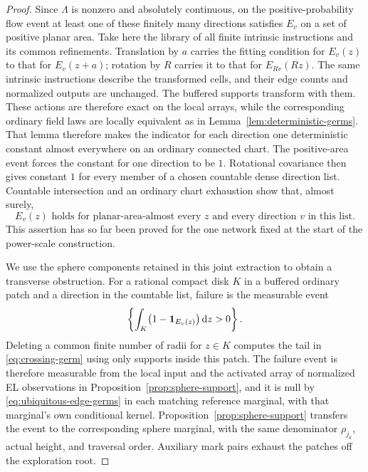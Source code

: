 \begin{proof}
Since \(\Lambda\) is nonzero and absolutely continuous, on the
positive-probability flow event at least one of these finitely many
directions satisfies \(E_v\) on a set of positive planar area.
Take here the library of all finite intrinsic instructions and its common
refinements.  Translation by \(a\) carries the fitting condition for
\(E_v(z)\) to that for \(E_v(z+a)\); rotation by \(R\) carries it to that
for \(E_{Rv}(Rz)\).  The same intrinsic instructions describe the
transformed cells, and their edge counts and normalized outputs are
unchanged.  The buffered supports transform with them.  These actions are
therefore exact on the local arrays, while the corresponding ordinary
field laws are locally equivalent as in
Lemma~\ref{lem:deterministic-germs}.  That lemma
therefore makes the indicator for each direction one deterministic
constant almost everywhere on an ordinary connected chart.  The
positive-area event forces the constant for one direction to be \(1\).
Rotational covariance then gives constant \(1\) for every member of a
chosen countable dense direction list.  Countable intersection and an
ordinary chart exhaustion show that, almost surely,
\begin{equation}\label{eq:ubiquitous-edge-germs}
 E_v(z)\text{ holds for planar-area-almost every }z
 \text{ and every direction }v\text{ in this list}.
\end{equation}
This assertion has so far been proved for the one network fixed at the
start of the power-scale construction.

We use the sphere components retained in this joint extraction to obtain
a transverse obstruction.  For a rational compact disk \(K\) in a buffered ordinary
patch and a direction in the countable list, failure is the measurable event
\[
 \left\{\int_K\bigl(1-\mathbf 1_{E_v(z)}\bigr)\,\mathrm d z>0\right\}.
\]
Deleting a common finite number of radii for \(z\in K\) computes the tail
in \eqref{eq:crossing-germ} using only supports inside this patch.  The
failure event is therefore measurable from the local input and the
activated array of normalized EL observations in
Proposition~\ref{prop:sphere-support}, and it is null by
\eqref{eq:ubiquitous-edge-germs} in each matching reference marginal,
with that marginal's own conditional kernel.
Proposition~\ref{prop:sphere-support} transfers the event to the
corresponding sphere marginal, with the same denominator
\(\rho_{j_k}\), actual height, and traversal order.  Auxiliary mark pairs
exhaust the patches off the exploration root.


\end{proof}
